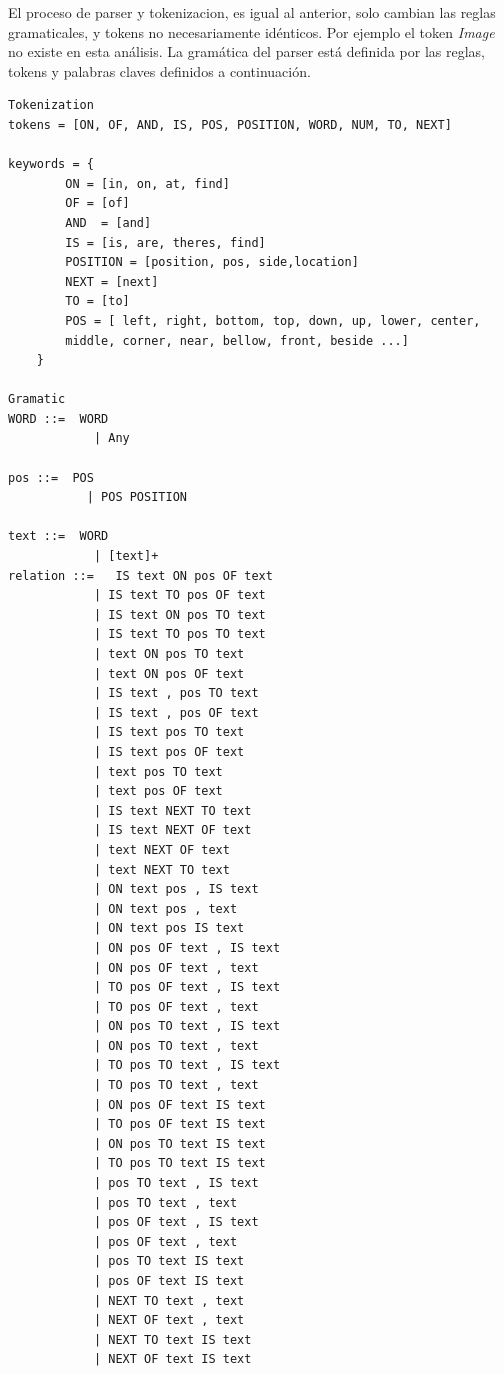 El proceso de parser y tokenizacion, es igual al anterior, solo cambian las reglas gramaticales, y tokens no necesariamente id\'enticos. Por ejemplo el token \textit{Image} no existe en esta an\'alisis. La gram\'atica del parser est\'a definida por las reglas, tokens y palabras claves definidos a continuaci\'on.
\begin{verbatim}
Tokenization
tokens = [ON, OF, AND, IS, POS, POSITION, WORD, NUM, TO, NEXT]

keywords = {
        ON = [in, on, at, find]
        OF = [of]
        AND  = [and]
        IS = [is, are, theres, find]
        POSITION = [position, pos, side,location]
        NEXT = [next]
        TO = [to]
        POS = [ left, right, bottom, top, down, up, lower, center,
        middle, corner, near, bellow, front, beside ...]
    }

Gramatic    
WORD ::=  WORD
            | Any
    
pos ::=  POS
           | POS POSITION 

text ::=  WORD
            | [text]+
relation ::=   IS text ON pos OF text
            | IS text TO pos OF text
            | IS text ON pos TO text
            | IS text TO pos TO text
            | text ON pos TO text
            | text ON pos OF text
            | IS text , pos TO text
            | IS text , pos OF text
            | IS text pos TO text
            | IS text pos OF text
            | text pos TO text
            | text pos OF text
            | IS text NEXT TO text
            | IS text NEXT OF text
            | text NEXT OF text
            | text NEXT TO text
            | ON text pos , IS text
            | ON text pos , text
            | ON text pos IS text
            | ON pos OF text , IS text
            | ON pos OF text , text
            | TO pos OF text , IS text
            | TO pos OF text , text
            | ON pos TO text , IS text
            | ON pos TO text , text
            | TO pos TO text , IS text
            | TO pos TO text , text
            | ON pos OF text IS text
            | TO pos OF text IS text
            | ON pos TO text IS text
            | TO pos TO text IS text
            | pos TO text , IS text
            | pos TO text , text
            | pos OF text , IS text
            | pos OF text , text
            | pos TO text IS text
            | pos OF text IS text
            | NEXT TO text , text
            | NEXT OF text , text
            | NEXT TO text IS text
            | NEXT OF text IS text
\end{verbatim}

